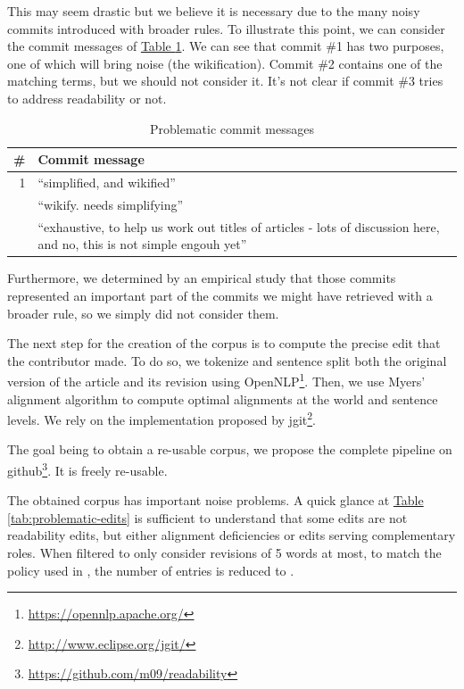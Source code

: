 \documentclass[a4paper, 11pt, onepage]{scrreprt}
\newcommand\tableref[1]{\hyperref[#1]{Table \ref*{#1}}}
\begin{document}
This may seem drastic but we believe it is necessary due to the many
noisy commits introduced with broader rules. To illustrate this point,
we can consider the commit messages of
\tableref{tab:problematic-commits}. We can see that commit \#1 has two
purposes, one of which will bring noise (the wikification). Commit \#2
contains one of the matching terms, but we should not consider
it. It's not clear if commit \#3 tries to address readability or not.

\begin{table}[H]
  \centering
  \caption{Problematic commit messages}
  \begin{tabular}{rp{12cm}}
    \toprule
    \# & Commit message \\
    \midrule
    1 & “simplified, and wikified” \\
    \addlinespace
    2 & “wikify. needs simplifying” \\
    \addlinespace
    3 & “exhaustive, to help us work out titles of articles - lots of
    discussion here, and no, this is not simple engouh yet” \\
  \end{tabular}
  \label{tab:problematic-commits}
\end{table}

Furthermore, we determined by an empirical study that those commits
represented an important part of the commits we might have retrieved
with a broader rule, so we simply did not consider them.

The next step for the creation of the corpus is to compute the precise
edit that the contributor made. To do so, we tokenize and sentence
split both the original version of the article and its revision using
OpenNLP\footnote{\url{https://opennlp.apache.org/}}. Then, we use
Myers' alignment algorithm \cite{myers1988optimal} to compute optimal
alignments at the world and sentence levels. We rely on the
implementation proposed by
jgit\footnote{\url{http://www.eclipse.org/jgit/}}.

The goal being to obtain a re-usable corpus, we propose the complete
pipeline on
github\footnote{\url{https://github.com/m09/readability}}. It is
freely re-usable.

The obtained corpus has important noise problems. A quick glance at
\tableref{tab:problematic-edits} is sufficient to understand that some
edits are not readability edits, but either alignment deficiencies or
edits serving complementary roles. When filtered to only consider
revisions of 5 words at most, to match the policy used in
\cite{yatskar2010sake}, the number of entries is reduced to
.
\end{document}
